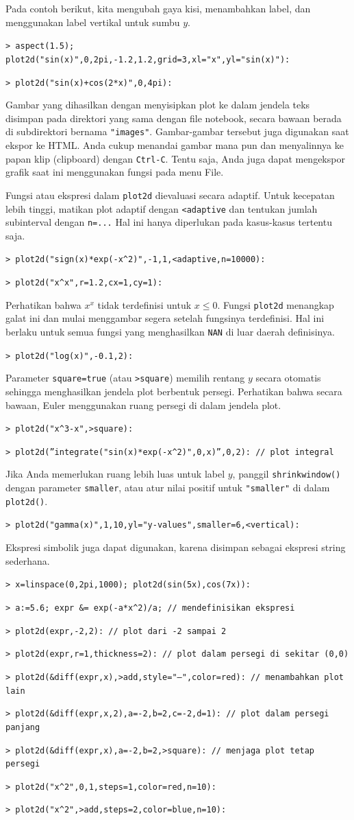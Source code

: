 \documentclass[11pt, a4paper]{article}
\newcommand{\emtcmd}[1]{\noindent\texttt{\textcolor{emtcommand}{>}\ #1}\par\smallskip}
\begin{document}
Pada contoh berikut, kita mengubah gaya kisi, menambahkan label, dan menggunakan label vertikal untuk sumbu $y$.

\emtcmd{aspect(1.5); plot2d("sin(x)",0,2pi,-1.2,1.2,grid=3,xl="x",yl="sin(x)"):}
\emtcmd{plot2d("sin(x)+cos(2*x)",0,4pi):}

Gambar yang dihasilkan dengan menyisipkan plot ke dalam jendela teks disimpan pada direktori yang sama dengan file notebook, secara bawaan berada di subdirektori bernama \texttt{"images"}. Gambar-gambar tersebut juga digunakan saat ekspor ke HTML. Anda cukup menandai gambar mana pun dan menyalinnya ke papan klip (clipboard) dengan \texttt{Ctrl-C}. Tentu saja, Anda juga dapat mengekspor grafik saat ini menggunakan fungsi pada menu File.

Fungsi atau ekspresi dalam \texttt{plot2d} dievaluasi secara adaptif. Untuk kecepatan lebih tinggi, matikan plot adaptif dengan \texttt{<adaptive} dan tentukan jumlah subinterval dengan \texttt{n=...} Hal ini hanya diperlukan pada kasus-kasus tertentu saja.

\emtcmd{plot2d("sign(x)*exp(-x\^{}2)",-1,1,<adaptive,n=10000):}
\emtcmd{plot2d("x\^{}x",r=1.2,cx=1,cy=1):}

Perhatikan bahwa $x^x$ tidak terdefinisi untuk $x \le 0$. Fungsi \texttt{plot2d} menangkap galat ini dan mulai menggambar segera setelah fungsinya terdefinisi. Hal ini berlaku untuk semua fungsi yang menghasilkan \texttt{NAN} di luar daerah definisinya.

\emtcmd{plot2d("log(x)",-0.1,2):}

Parameter \texttt{square=true} (atau \texttt{>square}) memilih rentang $y$ secara otomatis sehingga menghasilkan jendela plot berbentuk persegi. Perhatikan bahwa secara bawaan, Euler menggunakan ruang persegi di dalam jendela plot.

\emtcmd{plot2d("x\^{}3-x",>square):}
\emtcmd{plot2d(''integrate("sin(x)*exp(-x\^{}2)",0,x)'',0,2): \textcolor{emtcomment}{// plot integral}}

Jika Anda memerlukan ruang lebih luas untuk label $y$, panggil \texttt{shrinkwindow()} dengan parameter \texttt{smaller}, atau atur nilai positif untuk \texttt{"smaller"} di dalam \texttt{plot2d()}.

\emtcmd{plot2d("gamma(x)",1,10,yl="y-values",smaller=6,<vertical):}

Ekspresi simbolik juga dapat digunakan, karena disimpan sebagai ekspresi string sederhana.

\emtcmd{x=linspace(0,2pi,1000); plot2d(sin(5x),cos(7x)):}
\emtcmd{a:=5.6; expr \&= exp(-a*x\^{}2)/a; \textcolor{emtcomment}{// mendefinisikan ekspresi}}
\emtcmd{plot2d(expr,-2,2): \textcolor{emtcomment}{// plot dari -2 sampai 2}}
\emtcmd{plot2d(expr,r=1,thickness=2): \textcolor{emtcomment}{// plot dalam persegi di sekitar (0,0)}}
\emtcmd{plot2d(\&diff(expr,x),>add,style="--",color=red): \textcolor{emtcomment}{// menambahkan plot lain}}
\emtcmd{plot2d(\&diff(expr,x,2),a=-2,b=2,c=-2,d=1): \textcolor{emtcomment}{// plot dalam persegi panjang}}
\emtcmd{plot2d(\&diff(expr,x),a=-2,b=2,>square): \textcolor{emtcomment}{// menjaga plot tetap persegi}}
\emtcmd{plot2d("x\^{}2",0,1,steps=1,color=red,n=10):}
\emtcmd{plot2d("x\^{}2",>add,steps=2,color=blue,n=10):}
\end{document}

